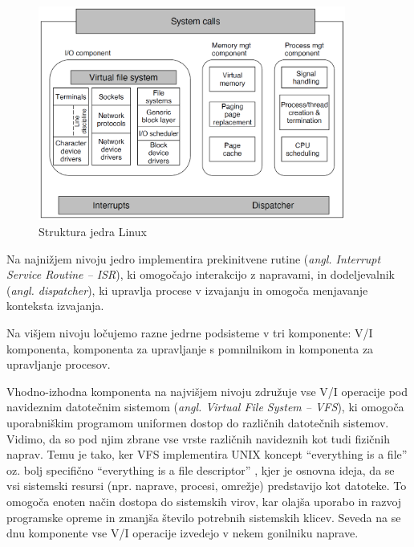 \documentclass[a4paper,12pt,openright]{book}
\begin{document}
\begin{figure}[h!]
	\begin{center}
		\includegraphics[width=0.9\textwidth]{images/linux_kernel_structure.png}
	\end{center}
	\caption{Struktura jedra Linux \cite{Tanenbaum_Bos_2023}}
	\label{fig:linux_kernel_structure}
\end{figure}

Na najnižjem nivoju jedro implementira prekinitvene rutine (\textit{angl. Interrupt Service Routine -- ISR}), ki omogočajo interakcijo z napravami, in dodeljevalnik (\textit{angl. dispatcher}), ki upravlja procese v izvajanju in omogoča menjavanje konteksta izvajanja.

Na višjem nivoju ločujemo razne jedrne podsisteme v tri komponente: V/I komponenta, komponenta za upravljanje s pomnilnikom in komponenta za upravljanje procesov.

Vhodno-izhodna komponenta na najvišjem nivoju združuje vse V/I operacije pod navideznim datotečnim sistemom (\textit{angl. Virtual File System -- VFS}), ki omogoča uporabniškim programom uniformen dostop do različnih datotečnih sistemov.
Vidimo, da so pod njim zbrane vse vrste različnih navideznih kot tudi fizičnih naprav.
Temu je tako, ker VFS implementira UNIX koncept ``everything is a file'' \cite{Garrels_2008} oz. bolj specifično ``everything is a file descriptor'' \cite{LWN_Brown_2010}, kjer je osnovna ideja, da se vsi sistemski resursi (npr. naprave, procesi, omrežje) predstavijo kot datoteke.
To omogoča enoten način dostopa do sistemskih virov, kar olajša uporabo in razvoj programske opreme in zmanjša število potrebnih sistemskih klicev.
Seveda na se dnu komponente vse V/I operacije izvedejo v nekem gonilniku naprave.
\end{document}
